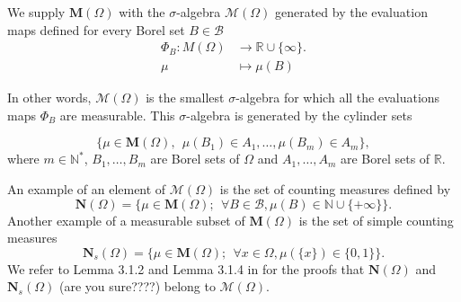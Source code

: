 \documentclass[twoside,11pt]{book}
\newtheorem{proposition}{Proposition}
\numberwithin{theorem}{chapter}
\numberwithin{definition}{chapter}
\numberwithin{proposition}{chapter}
\numberwithin{corollary}{chapter}
\numberwithin{example}{chapter}
\numberwithin{lemma}{chapter}
\begin{document}
We supply $\mathbf{M}(\Omega)$ with the $\sigma$-algebra $\mathcal{M}(\Omega)$ generated by the evaluation maps defined for every Borel set $B \in \mathcal{B}$
\begin{align}
\Phi_{B}: M(\Omega) &\rightarrow \mathbb{R}\cup \{\infty \}. \nonumber\\
\mu & \mapsto \mu(B) \nonumber
\end{align}

In other words, $\mathcal{M}(\Omega)$ is the smallest $\sigma$-algebra for which all the evaluations maps $\Phi_{B}$ are measurable. This $\sigma$-algebra is generated by the cylinder sets

\begin{equation}
\{ \mu \in \mathbf{M}(\Omega), \:\: \mu(B_{1}) \in A_{1}, \dots, \mu(B_{m}) \in A_{m} \},
\end{equation}
where $m \in \mathbb{N}^{*}$, $B_{1}, \dots, B_{m}$  are Borel sets of $\Omega$ and $A_{1}, \dots, A_{m}$ are Borel sets of $\mathbb{R}$.



An example of an element of $\mathcal{M}(\Omega)$ is the set of counting measures defined by
\begin{equation}
\mathbf{N}(\Omega) = \bigg\{ \mu \in \mathbf{M}(\Omega); \:\: \forall B \in \mathcal{B}, \mu(B) \in \mathbb{N}\cup \{+\infty\} \bigg\}.
\end{equation}
Another example of a measurable subset of $\mathbf{M}(\Omega)$ is the set of simple counting measures 
\begin{equation}
\mathbf{N}_{s}(\Omega) = \bigg\{ \mu \in \mathbf{M}(\Omega); \:\: \forall x \in \Omega, \mu(\{x\}) \in \{0,1\} \bigg\}.
\end{equation}
We refer to Lemma 3.1.2 and Lemma 3.1.4 in \citep{ScWe08} for the proofs that $\mathbf{N}(\Omega)$ and $\mathbf{N}_{s}(\Omega)$ (are you sure????) belong to $\mathcal{M}(\Omega)$.
\end{document}
